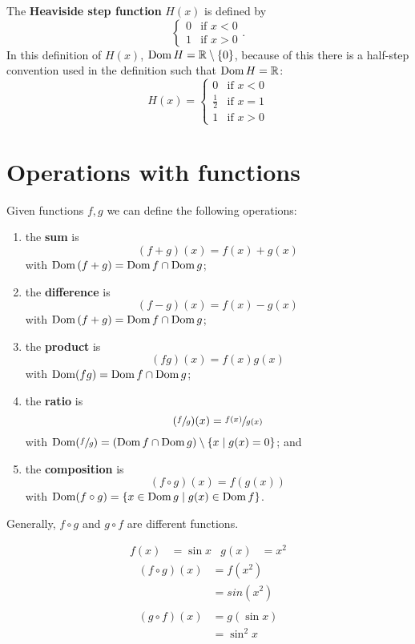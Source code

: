 \begin{example}
    The \textbf{Heaviside step function} $H(x)$ is defined by
    \[
        \begin{cases}
            0 & \text{if  }x<0\\
            1 & \text{if }x>0
        \end{cases}
        .
    \]
    In this definition of $H(x)$, $\operatorname{Dom} H=\mathbb R\setminus\{0\}$, because of this there is a half-step convention used in the definition such that $\operatorname{Dom} H=\mathbb R$:
    \[
        H(x)=
        \begin{cases}
            0 & \text{if  }x<0\\
            \frac12 & \text{if }x=1\\
            1 & \text{if }x>0
        \end{cases}
    \]
\end{example}

\section{Operations with functions}

\begin{definition}
    Given functions $f,g$ we can define the following operations:
    \begin{enumerate}
        \item the \textbf{sum} is \[(f+g)(x)=f(x)+g(x)\] with $\operatorname{Dom}{(f+g)}=\operatorname{Dom} f\cap\operatorname{Dom} g$;
        \item the \textbf{difference} is \[(f-g)(x)=f(x)-g(x)\] with $\operatorname{Dom}{(f+g)}=\operatorname{Dom} f\cap\operatorname{Dom} g$;
        \item the \textbf{product} is \[(fg)(x)=f(x)g(x)\] with $\operatorname{Dom}(fg)=\operatorname{Dom} f\cap\operatorname{Dom} g$;
        \item the \textbf{ratio} is \[(\sfrac fg)(x)=\sfrac{f(x)}{g(x)}\] with $\operatorname{Dom}(\sfrac fg)=(\operatorname{Dom} f\cap\operatorname{Dom} g)\setminus\{x\mid g(x)=0\}$; and
        \item the \textbf{composition} is \[(f\circ g)(x)=f(g(x))\] with $\operatorname{Dom}(f\circ g)=\{x\in\operatorname{Dom} g\mid g(x)\in\operatorname{Dom} f\}$.
    \end{enumerate}
\end{definition}

\begin{remark}
    Generally, $f\circ g$ and $g\circ f$ are different functions.
\end{remark}

\begin{example}
    \begin{align*}
        f(x)&=\sin{x}&g(x)&=x^2
    \end{align*}
    \begin{align*}
        (f\circ g)(x)&=f(x^2)\\
        &=sin{(x^2)}\\\\
        (g\circ f)(x)&=g(\sin{x})\\
        &=\sin^2{x}
    \end{align*}
\end{example}

